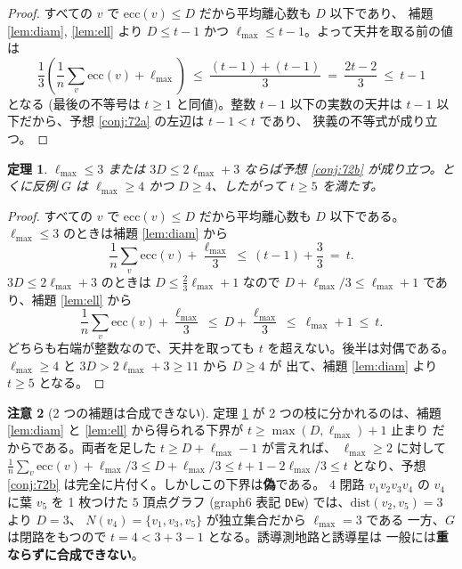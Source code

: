 \documentclass[paper=a4,fontsize=10.5pt,jafontsize=10.5pt]{jlreq}
\theoremstyle{plain}
\newtheorem{theorem}{定理}[section]
\theoremstyle{definition}
\newtheorem{remark}[theorem]{注意}
\begin{document}
\begin{proof}
すべての $v$ で $\mathrm{ecc}(v) \le D$ だから平均離心数も $D$ 以下であり、
補題 \ref{lem:diam}, \ref{lem:ell} より $D \le t-1$ かつ
$\ell_{\max} \le t-1$。よって天井を取る前の値は
\[ \frac{1}{3}\left( \frac{1}{n}\sum_{v} \mathrm{ecc}(v)
   + \ell_{\max} \right) \ \le \ \frac{(t-1) + (t-1)}{3}
   \ = \ \frac{2t-2}{3} \ \le \ t - 1 \]
となる (最後の不等号は $t \ge 1$ と同値)。整数 $t-1$ 以下の実数の天井は
$t-1$ 以下だから、予想 \ref{conj:72a} の左辺は $t-1 < t$ であり、
狭義の不等式が成り立つ。
\end{proof}

\begin{theorem}\label{thm:72b}
$\ell_{\max} \le 3$ または $3D \le 2\ell_{\max} + 3$ ならば予想
\ref{conj:72b} が成り立つ。とくに反例 $G$ は $\ell_{\max} \ge 4$ かつ
$D \ge 4$、したがって $t \ge 5$ を満たす。
\end{theorem}

\begin{proof}
すべての $v$ で $\mathrm{ecc}(v) \le D$ だから平均離心数も $D$ 以下である。
$\ell_{\max} \le 3$ のときは補題 \ref{lem:diam} から
\[ \frac{1}{n}\sum_{v} \mathrm{ecc}(v) + \frac{\ell_{\max}}{3}
   \ \le \ (t-1) + \frac{3}{3} \ = \ t . \]
$3D \le 2\ell_{\max} + 3$ のときは $D \le \frac{2}{3}\ell_{\max} + 1$
なので $D + \ell_{\max}/3 \le \ell_{\max} + 1$ であり、補題
\ref{lem:ell} から
\[ \frac{1}{n}\sum_{v} \mathrm{ecc}(v) + \frac{\ell_{\max}}{3}
   \ \le \ D + \frac{\ell_{\max}}{3} \ \le \ \ell_{\max} + 1
   \ \le \ t . \]
どちらも右端が整数なので、天井を取っても $t$ を超えない。後半は対偶である。
$\ell_{\max} \ge 4$ と $3D > 2\ell_{\max} + 3 \ge 11$ から $D \ge 4$ が
出て、補題 \ref{lem:diam} より $t \ge 5$ となる。
\end{proof}

\begin{remark}[2 つの補題は合成できない]\label{rem:l3}
定理 \ref{thm:72b} が 2 つの枝に分かれるのは、補題 \ref{lem:diam} と
\ref{lem:ell} から得られる下界が $t \ge \max(D, \ell_{\max}) + 1$ 止まり
だからである。両者を足した $t \ge D + \ell_{\max} - 1$ が言えれば、
$\ell_{\max} \ge 2$ に対して
$\frac{1}{n}\sum_v \mathrm{ecc}(v) + \ell_{\max}/3
\le D + \ell_{\max}/3 \le t + 1 - 2\ell_{\max}/3 \le t$ となり、予想
\ref{conj:72b} は完全に片付く。しかしこの下界は\textbf{偽}である。
$4$ 閉路 $v_1 v_2 v_3 v_4$ の $v_4$ に葉 $v_5$ を 1 枚つけた $5$ 頂点グラフ
(graph6 表記 \texttt{DEw}) では、$\mathrm{dist}(v_2, v_5) = 3$ より $D = 3$、
$N(v_4) = \{v_1, v_3, v_5\}$ が独立集合だから $\ell_{\max} = 3$ である
一方、$G$ は閉路をもつので $t = 4 < 3 + 3 - 1$ となる。誘導測地路と誘導星は
一般には\textbf{重ならずに合成できない}。
\end{remark}
\end{document}
